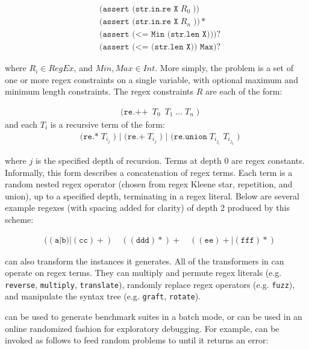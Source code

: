 {\begingroup
\footnotesize
\begin{align*}
  & \texttt{(assert (str.in.re X}\; R_0\; \texttt{))} \\
  & \texttt{(assert (str.in.re X}\; R_n\; \texttt{))}* \\
  & \texttt{(assert (<= Min (str.len X)))}? \\
  & \texttt{(assert (<= (str.len X)) Max)}?
\end{align*}
\endgroup

where $R_i \in RegEx$, and $Min, Max \in Int$. More simply, the
problem is a set of one or more regex constraints on a single
variable, with optional maximum and minimum length constraints. The
regex constraints $R$ are each of the form:

\begingroup
\footnotesize
\begin{align*}
  & \texttt{(re.++}\; \ T_0\; \ T_1\; \texttt{...}\; T_n\; \texttt{)}
\end{align*}
\endgroup
and each $T_i$ is a recursive term of the form:
\begingroup
\footnotesize
\begin{align*}
  & \texttt{(re.*}\; T_{i_j}\; \texttt{) | (re.+}\; T_{i_j}\;
  \texttt{) | (re.union}\; T_{i_{j_1}}\; T_{i_{j_2}}\; \texttt{)}
\end{align*}
\endgroup

where $j$ is the specified depth of recursion. Terms at depth 0 are
regex constants. Informally, this form describes a concatenation of
regex terms. Each term is a random nested regex operator (chosen from
regex Kleene star, repetition, and union), up to a specified depth,
terminating in a regex literal. Below are several example regexes
(with spacing added for clarity) of depth 2 produced by this scheme:

\begingroup
\footnotesize
\begin{align*}
  & ((\texttt{a}|\texttt{b})|(\texttt{cc})+)\quad
  ((\texttt{ddd})*)+\quad ((\texttt{ee})+|(\texttt{fff})*)
\end{align*}
\endgroup

\fuzzer{} can also transform the instances it generates. All of the
transformers in \transformer{} can operate on regex terms. They can
multiply and permute regex literals (e.g. \texttt{reverse},
\texttt{multiply}, \texttt{translate}), randomly replace regex
operators (e.g. \texttt{fuzz}), and manipulate the syntax tree
(e.g. \texttt{graft}, \texttt{rotate}).

\vspace{0.2cm}
 \fuzzer{} can be used to
generate benchmark suites in a batch mode, or can be used in an online
randomized fashion for exploratory debugging. For example, \fuzzer{}
can be invoked as follows to feed random problems to \cvc{} until it
returns an error:

}
